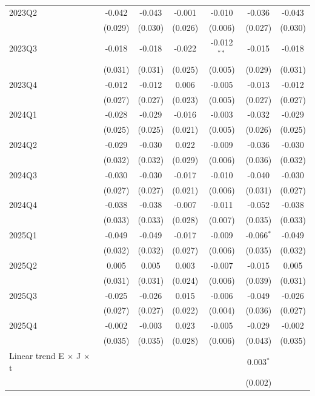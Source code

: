 \begin{table}[htbp]
\begin{tabular}{lcccccc}
2023Q2 & -0.042 & -0.043 & -0.001 & -0.010 & -0.036 & -0.043 \\
 & (0.029) & (0.030) & (0.026) & (0.006) & (0.027) & (0.030) \\
2023Q3 & -0.018 & -0.018 & -0.022 & -0.012$^{**}$ & -0.015 & -0.018 \\
 & (0.031) & (0.031) & (0.025) & (0.005) & (0.029) & (0.031) \\
2023Q4 & -0.012 & -0.012 & 0.006 & -0.005 & -0.013 & -0.012 \\
 & (0.027) & (0.027) & (0.023) & (0.005) & (0.027) & (0.027) \\
2024Q1 & -0.028 & -0.029 & -0.016 & -0.003 & -0.032 & -0.029 \\
 & (0.025) & (0.025) & (0.021) & (0.005) & (0.026) & (0.025) \\
2024Q2 & -0.029 & -0.030 & 0.022 & -0.009 & -0.036 & -0.030 \\
 & (0.032) & (0.032) & (0.029) & (0.006) & (0.036) & (0.032) \\
2024Q3 & -0.030 & -0.030 & -0.017 & -0.010 & -0.040 & -0.030 \\
 & (0.027) & (0.027) & (0.021) & (0.006) & (0.031) & (0.027) \\
2024Q4 & -0.038 & -0.038 & -0.007 & -0.011 & -0.052 & -0.038 \\
 & (0.033) & (0.033) & (0.028) & (0.007) & (0.035) & (0.033) \\
2025Q1 & -0.049 & -0.049 & -0.017 & -0.009 & -0.066$^{*}$ & -0.049 \\
 & (0.032) & (0.032) & (0.027) & (0.006) & (0.035) & (0.032) \\
2025Q2 & 0.005 & 0.005 & 0.003 & -0.007 & -0.015 & 0.005 \\
 & (0.031) & (0.031) & (0.024) & (0.006) & (0.039) & (0.031) \\
2025Q3 & -0.025 & -0.026 & 0.015 & -0.006 & -0.049 & -0.026 \\
 & (0.027) & (0.027) & (0.022) & (0.004) & (0.036) & (0.027) \\
2025Q4 & -0.002 & -0.003 & 0.023 & -0.005 & -0.029 & -0.002 \\
 & (0.035) & (0.035) & (0.028) & (0.006) & (0.043) & (0.035) \\
Linear trend E $\times$ J $\times$ t &  &  &  &  & 0.003$^{*}$ &  \\
 &  &  &  &  & (0.002) &  \\
\bottomrule
\end{tabular}
\par\vspace{2pt}{\footnotesize Reference quarter 2022Q3 omitted. Standard errors clustered on occupation in parentheses. * p<0.10, ** p<0.05, *** p<0.01. Model 2 replaces the pre-period dummies with the linear trend; its post coefficients are deviations from the extrapolated trend.}
\end{table}
